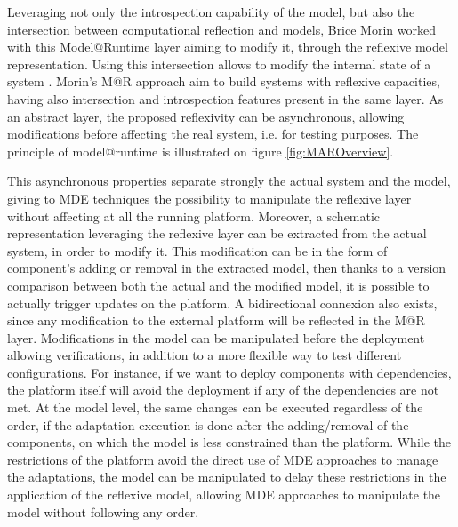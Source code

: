 Leveraging not only the introspection capability of the model, but also the intersection between computational reflection and models, Brice Morin \cite{morin2010leveraging} worked with this Model@Runtime layer aiming to modify it, through the reflexive model representation.
Using this intersection allows to modify the internal state of a system \cite{paepcke1993object}.
Morin's M@R approach aim to build systems with reflexive capacities, having also intersection and introspection features present in the same layer.
As an abstract layer, the proposed reflexivity can be asynchronous, allowing modifications before affecting the real system, i.e. for testing purposes. 
The principle of model@runtime is illustrated on figure \ref{fig:MAROverview}.

This asynchronous properties separate strongly the actual system and the model, giving to MDE techniques the possibility to manipulate the reflexive layer without affecting at all the running platform.
Moreover, a schematic representation leveraging the reflexive layer can be extracted from the actual system, in order to modify it.
This modification can be in the form of component's adding or removal in the extracted model, then thanks to a version comparison between both the actual and the modified model, it is possible to actually trigger updates on the platform.
A bidirectional connexion also exists, since any modification to the external platform will be reflected in the M@R layer.
Modifications in the model can be manipulated before the deployment allowing verifications, in addition to a more flexible way to test different configurations.
For instance, if we want to deploy components with dependencies, the platform itself will avoid the deployment if any of the dependencies are not met.
At the model level, the same changes can be executed regardless of the order, if the adaptation execution is done after the adding/removal of the components, on which the model is less constrained than the platform.
While the restrictions of the platform avoid the direct use of MDE approaches to manage the adaptations, the model can be manipulated to delay these restrictions in the application of the reflexive model, allowing MDE approaches to manipulate the model without following any order.

